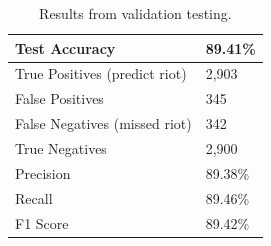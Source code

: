 \begin{table}
    \centering
    \begin{tabular}{|l|l|}
        \hline
        \textbf{Test Accuracy}  & \textbf{89.41\%} \\  \hline
        True Positives (predict riot) & 2,903 \\       \hline
        False Positives & 345 \\   \hline
        False Negatives (missed riot) & 342 \\  \hline
        True Negatives & 2,900 \\  \hline
        \hline
        Precision & 89.38\% \\        \hline
        Recall & 89.46\% \\        \hline
        F1 Score & 89.42\%  \\
        \hline
    \end{tabular}
    \caption{Results from validation testing.}
    \label{tab:validation_global_results}
\end{table}



